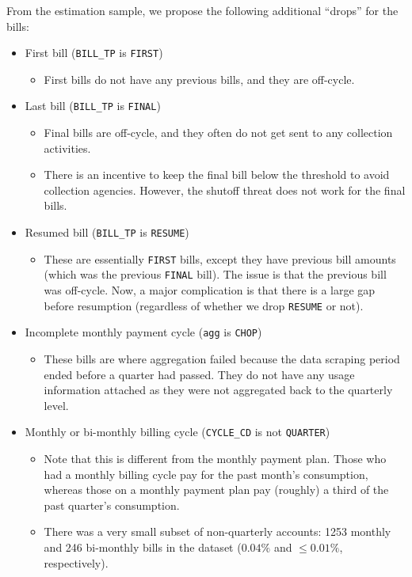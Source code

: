 \documentclass[11pt]{article}
\begin{document}
From the estimation sample, we propose the following additional ``drops'' for the bills:
\begin{itemize}
	\item First bill (\texttt{BILL\_TP} is \texttt{FIRST})
	\begin{itemize}
		\item First bills do not have any previous bills, and they are off-cycle.
	\end{itemize}
	\item Last bill (\texttt{BILL\_TP} is \texttt{FINAL})
	\begin{itemize}
		\item Final bills are off-cycle, and they often do not get sent to any collection activities.
		\item There is an incentive to keep the final bill below the threshold to avoid collection agencies. However, the shutoff threat does not work for the final bills.
	\end{itemize}
	\item Resumed bill (\texttt{BILL\_TP} is \texttt{RESUME})
	\begin{itemize}
		\item These are essentially \texttt{FIRST} bills, except they have previous bill amounts (which was the previous \texttt{FINAL} bill). The issue is that the previous bill was off-cycle. Now, a major complication is that there is a large gap before resumption (regardless of whether we drop \texttt{RESUME} or not).
	\end{itemize}
	\item Incomplete monthly payment cycle (\texttt{agg} is \texttt{CHOP})
	\begin{itemize}
		\item These bills are where aggregation failed because the data scraping period ended before a quarter had passed. They do not have any usage information attached as they were not aggregated back to the quarterly level.
	\end{itemize}
	\item Monthly or bi-monthly billing cycle (\texttt{CYCLE\_CD} is not \texttt{QUARTER})
	\begin{itemize}
		\item Note that this is different from the monthly payment plan. Those who had a monthly billing cycle pay for the past month's consumption, whereas those on a monthly payment plan pay (roughly) a third of the past quarter's consumption.
		\item There was a very small subset of non-quarterly accounts: 1253 monthly and 246 bi-monthly bills in the dataset ($0.04\%$ and $\leq0.01\%$, respectively).
	\end{itemize}
\end{itemize}
\end{document}
